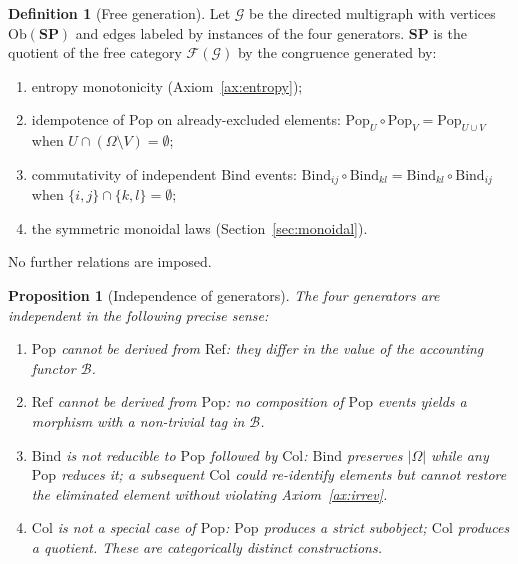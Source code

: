 \documentclass[12pt,a4paper]{article}
\newtheorem{proposition}[theorem]{Proposition}
\theoremstyle{definition}
\newtheorem{definition}[theorem]{Definition}
\theoremstyle{remark}
\newcommand{\SP}{\mathbf{SP}}
\newcommand{\Ob}{\mathrm{Ob}}
\newcommand{\Pop}{\mathrm{Pop}}
\newcommand{\Ref}{\mathrm{Ref}}
\newcommand{\Bind}{\mathrm{Bind}}
\newcommand{\Col}{\mathrm{Col}}
\begin{document}
\begin{definition}[Free generation]
\label{def:free-gen}
Let $\mathcal{G}$ be the directed multigraph with vertices $\Ob(\SP)$ and edges
labeled by instances of the four generators. $\SP$ is the quotient of the free
category $\mathcal{F}(\mathcal{G})$ by the congruence generated by:
\begin{enumerate}[label=(\alph*)]
\item entropy monotonicity (Axiom~\ref{ax:entropy});
\item idempotence of Pop on already-excluded elements: $\Pop_U\circ\Pop_V
  =\Pop_{U\cup V}$ when $U\cap(\Omega\setminus V)=\emptyset$;
\item commutativity of independent Bind events: $\Bind_{ij}\circ\Bind_{kl}
  =\Bind_{kl}\circ\Bind_{ij}$ when $\{i,j\}\cap\{k,l\}=\emptyset$;
\item the symmetric monoidal laws (Section~\ref{sec:monoidal}).
\end{enumerate}
No further relations are imposed.
\end{definition}

\begin{proposition}[Independence of generators]
\label{prop:independence}
The four generators are independent in the following precise sense:
\begin{enumerate}[label=(\roman*)]
\item $\Pop$ cannot be derived from $\Ref$: they differ in the value of the
  accounting functor $\mathcal{B}$.
\item $\Ref$ cannot be derived from $\Pop$: no composition of $\Pop$ events
  yields a morphism with a non-trivial tag in $\mathcal{B}$.
\item $\Bind$ is not reducible to $\Pop$ followed by $\Col$: $\Bind$ preserves
  $|\Omega|$ while any $\Pop$ reduces it; a subsequent $\Col$ could re-identify
  elements but cannot restore the eliminated element without violating
  Axiom~\ref{ax:irrev}.
\item $\Col$ is not a special case of $\Pop$: $\Pop$ produces a strict subobject;
  $\Col$ produces a quotient. These are categorically distinct constructions.
\end{enumerate}
\end{proposition}
\end{document}
